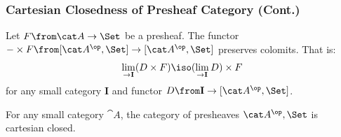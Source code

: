 \documentclass{beamer}
\begin{document}
\begin{frame}
  \frametitle{Cartesian Closedness of Presheaf Category (Cont.)}
  \begin{lemma}
    Let $F\from \cat A\to\Set$ be a presheaf. The functor $-\times F\from [\cat A^\op,\Set]\to[\cat A^\op,\Set]$ preserves colomits. That is:
    \begin{align*}
      \lim_{\to \mathbf I} (D\times F)\iso (\lim_{\to \mathbf I} D)\times F
    \end{align*}
    for any small category $\mathbf I$ and functor $D\from\mathbf I\to [\cat A^\op,\Set]$.
  \end{lemma}

  \begin{theorem}
    For any small category $\cat A$, the category of presheaves $\cat A^\op,\Set$ is cartesian closed.
  \end{theorem}
\end{frame}
\end{document}
